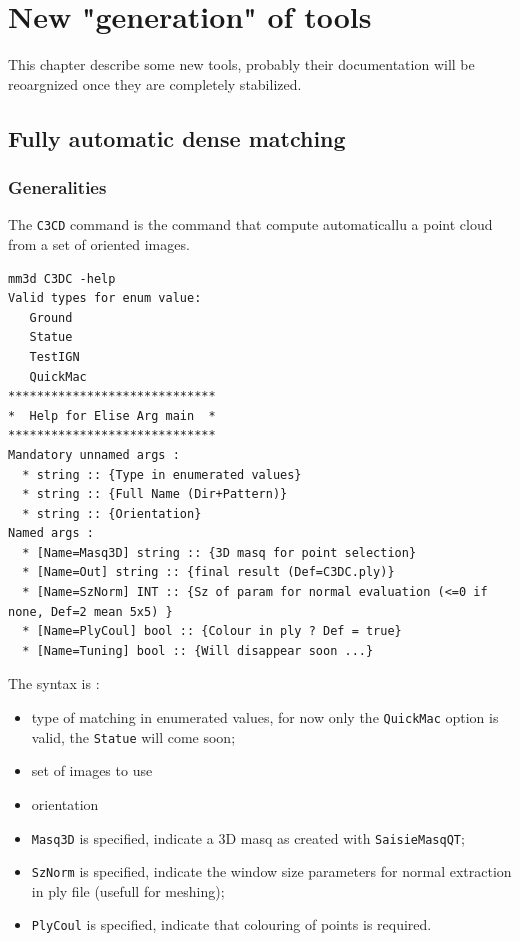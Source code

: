 \chapter{New "generation" of tools}

This chapter describe  some new tools, probably their documentation will be reoargnized once they are completely stabilized.



\section{Fully automatic dense matching}

\subsection{Generalities}

The {\tt C3CD} command is the command that compute automaticallu a point cloud from a set of oriented images.

\begin{verbatim}
mm3d C3DC -help
Valid types for enum value: 
   Ground
   Statue
   TestIGN
   QuickMac
*****************************
*  Help for Elise Arg main  *
*****************************
Mandatory unnamed args : 
  * string :: {Type in enumerated values}
  * string :: {Full Name (Dir+Pattern)}
  * string :: {Orientation}
Named args : 
  * [Name=Masq3D] string :: {3D masq for point selection}
  * [Name=Out] string :: {final result (Def=C3DC.ply)}
  * [Name=SzNorm] INT :: {Sz of param for normal evaluation (<=0 if none, Def=2 mean 5x5) }
  * [Name=PlyCoul] bool :: {Colour in ply ? Def = true}
  * [Name=Tuning] bool :: {Will disappear soon ...}
\end{verbatim}


The syntax is :

\begin{itemize}
  \item type of matching in enumerated values, for now only the {\tt QuickMac} 
        option is valid, the {\tt Statue} will come soon; 

  \item set of images to use

  \item orientation

  \item {\tt Masq3D} is specified, indicate a 3D masq as created with {\tt SaisieMasqQT};
  \item {\tt SzNorm} is specified, indicate the window size parameters for normal extraction in ply file
        (usefull for meshing);
  \item {\tt PlyCoul} is specified, indicate that colouring of points is required.
\end{itemize}


